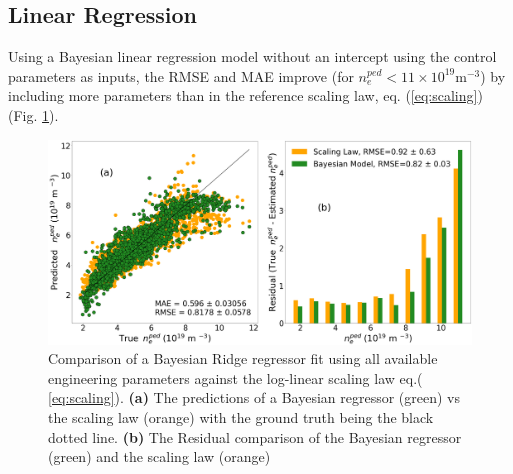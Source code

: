 \documentclass[a4paper, twoside, final, 12pt]{article}
\begin{document}
{\subsection{Linear Regression}

Using a Bayesian linear regression model without an intercept using the control parameters as inputs, the RMSE and MAE improve (for $n_e^{ped} < 11 \times 10^{19} \text{m} ^{-3}$) by including more parameters than in the reference scaling law, eq. (\ref{eq:scaling}) (Fig. \ref{fig:lin_reg}).
\begin{figure}[hb!]
	\centering
	\includegraphics[scale=0.18]{./src/bayes_comp}
	\caption{Comparison of a Bayesian Ridge regressor fit using all available engineering parameters against the log-linear scaling law eq.\;( \ref{eq:scaling}). \textbf{(a)} The predictions of a Bayesian regressor (green) vs the scaling law (orange) with the ground truth being the black dotted line. \textbf{(b)} The Residual comparison of the Bayesian regressor (green) and the scaling law (orange) }
	\label{fig:lin_reg}
\end{figure}
}
\end{document}
